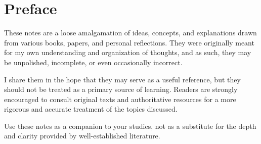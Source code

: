 \chapter*{Preface}
These notes are a loose amalgamation of ideas, concepts, and
explanations drawn from various books, papers, and personal
reflections. They were originally meant for my own understanding and
organization of thoughts, and as such, they may be unpolished,
incomplete, or even occasionally incorrect.

I share them in the hope that they may serve as a useful reference,
but they should not be treated as a primary source of learning.
Readers are strongly encouraged to consult original texts and
authoritative resources for a more rigorous and accurate treatment of
the topics discussed.

Use these notes as a companion to your studies, not as a substitute
for the depth and clarity provided by well-established literature.

